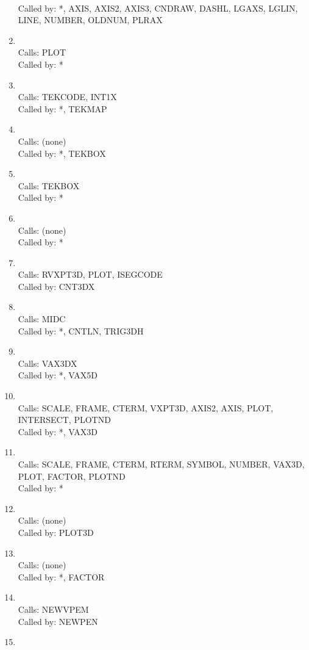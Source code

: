 \documentclass[11pt]{report}
\begin{document}
\begin{enumerate}
\\ Called by: *, AXIS, AXIS2, AXIS3, CNDRAW, DASHL, LGAXS, LGLIN, LINE,
NUMBER, OLDNUM, PLRAX
\item {}
\\ Calls:  PLOT
\\ Called by: *
\item {}
\\ Calls:  TEKCODE, INT1X
\\ Called by: *, TEKMAP
\item {}
\\ Calls:  (none)
\\ Called by: *, TEKBOX
\item {}
\\ Calls:  TEKBOX
\\ Called by: *
\item {}
\\ Calls:  (none)
\\ Called by: *
\item {}
\\ Calls:  RVXPT3D, PLOT, ISEGCODE
\\ Called by: CNT3DX
\item {}
\\ Calls:  MIDC
\\ Called by: *, CNTLN, TRIG3DH
\item {}
\\ Calls:  VAX3DX
\\ Called by: *, VAX5D
\item {}
\\ Calls:  SCALE, FRAME, CTERM, VXPT3D, AXIS2, AXIS, PLOT, INTERSECT,
PLOTND
\\ Called by: *, VAX3D
\item {}
\\ Calls:  SCALE, FRAME, CTERM, RTERM, SYMBOL, NUMBER, VAX3D, PLOT,
FACTOR, PLOTND
\\ Called by: *
\item {}
\\ Calls:  (none)
\\ Called by: PLOT3D
\item {}
\\ Calls:  (none)
\\ Called by: *, FACTOR
\item {}
\\ Calls:  NEWVPEM
\\ Called by: NEWPEN
\item {}

\end{enumerate}
\end{document}
